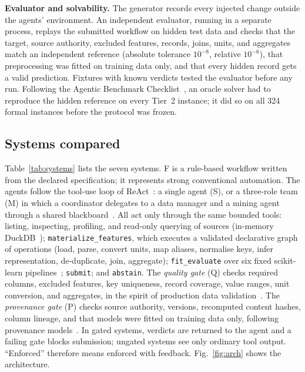 \documentclass[conference]{IEEEtran}
\newcommand{\sys}[1]{\textsf{#1}}
\begin{document}
\textbf{Evaluator and solvability.} The generator records every injected change outside the agents' environment. An
independent evaluator, running in a separate process, replays the submitted workflow on hidden test data and checks
that the target, source authority, excluded features, records, joins, units, and aggregates match an independent
reference (absolute tolerance $10^{-8}$, relative $10^{-6}$), that preprocessing was fitted on training data only,
and that every hidden record gets a valid prediction. Fixtures with known verdicts tested the evaluator before any
run. Following the Agentic Benchmark Checklist~\cite{zhu2025abc}, an oracle solver had to reproduce the hidden
reference on every Tier~2 instance; it did so on all 324 formal instances before the protocol was frozen.

\subsection{Systems compared}
\label{sec:systems}
Table~\ref{tab:systems} lists the seven systems. \sys{F} is a rule-based workflow written from the declared
specification; it represents strong conventional automation. The agents follow the tool-use loop of
ReAct~\cite{yao2023react}: a single agent (\sys{S}), or a three-role team (\sys{M}) in which a coordinator delegates
to a data manager and a mining agent through a shared blackboard~\cite{wu2023autogen,hong2024metagpt}. All act only
through the same bounded tools: listing, inspecting, profiling, and read-only querying of sources (in-memory
DuckDB~\cite{raasveldt2019duckdb}); \texttt{materialize\_features}, which executes a validated declarative graph of
operations (load, parse, convert units, map aliases, normalise keys, infer representation, de-duplicate, join,
aggregate); \texttt{fit\_evaluate} over six fixed scikit-learn pipelines~\cite{pedregosa2011sklearn}; \texttt{submit};
and \texttt{abstain}. The \emph{quality gate} (Q) checks required columns, excluded features, key uniqueness, record
coverage, value ranges, unit conversion, and aggregates, in the spirit of production data
validation~\cite{polyzotis2019datavalidation,schelter2018deequ}. The \emph{provenance gate} (P) checks source
authority, versions, recomputed content hashes, column lineage, and that models were fitted on training data only,
following provenance models~\cite{w3c2013provdm}. In gated systems, verdicts are returned to the agent and a failing
gate blocks submission; ungated systems see only ordinary tool output. ``Enforced'' therefore means enforced with
feedback. Fig.~\ref{fig:arch} shows the architecture.
\end{document}
